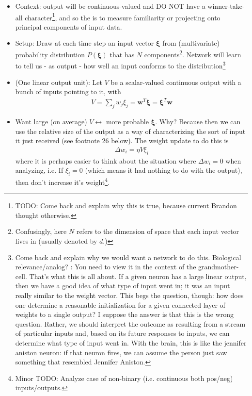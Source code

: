\documentclass[12pt]{article}
\begin{document}
\begin{itemize}
\begin{itemize}
		\item \textsc{} Context: output will be continuous-valued and DO NOT have a winner-take-all character\footnote{TODO: Come back and explain why this is true, because current Brandon thought otherwise.}, and so the  is to measure familiarity or projecting onto principal components of input data. 
		\item Setup: Draw at each time step an input vector $\bm{\xi}$ from (multivariate) probability distribution $P(\bm{\xi})$ that has $N$ components\footnote{Confusingly, here $N$ refers to the dimension of space that each input vector lives in (usually denoted by $d$.)}. Network will learn to tell us - as output - how well an input conforms to the distribution\footnote{ Come back and explain why we would want a network to do this. Biological relevance/analog? : You need to view it in the context of the grandmother-cell. That's what this is all about. If a given neuron has a large linear output, then we have a good idea of what type of input went in; it was an input really similar to the weight vector. This begs the question, though: how does one determine a reasonable initialization for a given connected layer of weights to a single output? I suppose the answer is that this is the wrong question. Rather, we should interpret the outcome as resulting from a stream of particular inputs and, based on its future responses to inputs, we can determine what type of input went in. With the brain, this is like the jennifer aniston neuron: if that neuron fires, we can assume the person just saw something that resembled Jennifer Aniston.}
		\item (One linear output unit): Let $V$ be a scalar-valued continuous output with a bunch of inputs pointing to it, with 
		\begin{align}
			V = \sum_j w_j \xi_j = \bm{w}^T \bm{\xi} = \bm{\xi}^T \bm{w}
		\end{align}
		\item Want large (on average) $V \leftrightarrow $ more probable $\bm{\xi}$. Why? Because then we can use the relative size of the output as a way of characterizing the sort of input it just received (see footnote 26 below). The weight update to do this is 
		\begin{align}
			\Delta w_i = \eta V \xi_i
		\end{align}
		where it is perhaps easier to think about the situation where $\Delta w_i = 0$ when analyzing, i.e. If $\xi_i = 0$ (which means it had nothing to do with the output), then don't increase it's weight\footnote{Minor TODO: Analyze case of non-binary (i.e. continuous both pos/neg) inputs/outputs.}. 

\end{itemize}
\end{itemize}
\end{document}
